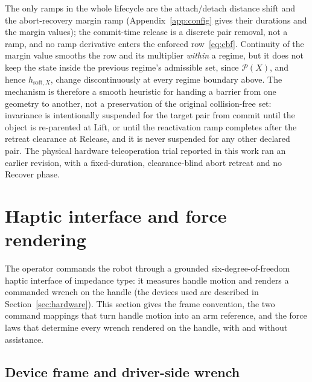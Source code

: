 The only ramps in the whole lifecycle are the attach/detach distance shift and the abort-recovery margin ramp (Appendix~\ref{app:config} gives their durations and the margin values); the commit-time release is a discrete pair removal, not a ramp, and no ramp derivative enters the enforced row~\eqref{eq:cbf}. Continuity of the margin value smooths the row and its multiplier \emph{within} a regime, but it does not keep the state inside the previous regime's admissible set, since $\mathcal{P}(X)$, and hence $h_{\text{soft},X}$, change discontinuously at every regime boundary above. The mechanism is therefore a smooth heuristic for handing a barrier from one geometry to another, not a preservation of the original collision-free set: invariance is intentionally suspended for the target pair from commit until the object is re-parented at Lift, or until the reactivation ramp completes after the retreat clearance at Release, and it is never suspended for any other declared pair. The physical hardware teleoperation trial reported in this work ran an earlier revision, with a fixed-duration, clearance-blind abort retreat and no Recover phase.

\section{Haptic interface and force rendering}
\label{sec:teleop}

The operator commands the robot through a grounded six-degree-of-freedom haptic interface of impedance type: it measures handle motion and renders a commanded wrench on the handle (the devices used are described in Section~\ref{sec:hardware}). This section gives the frame convention, the two command mappings that turn handle motion into an arm reference, and the force laws that determine every wrench rendered on the handle, with and without assistance.

\subsection{Device frame and driver-side wrench}
\label{sec:device}

